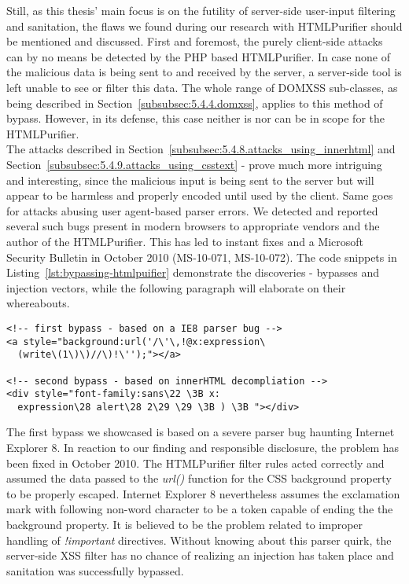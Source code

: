       Still, as this thesis' main focus is on the futility of server-side user-input filtering and sanitation, the flaws we found during our research with HTMLPurifier should be mentioned and discussed. First and foremost, the purely client-side attacks can by no means be detected by the PHP based HTMLPurifier. In case none of the malicious data is being sent to and received by the server, a server-side tool is left unable to see or filter this data. The whole range of DOMXSS sub-classes, as being described in Section~\ref{subsubsec:5.4.4.domxss}, applies to this method of bypass. However, in its defense, this case neither is nor can be in scope for the HTMLPurifier.\\

      The attacks described in Section~\ref{subsubsec:5.4.8.attacks_using_innerhtml} and Section~\ref{subsubsec:5.4.9.attacks_using_csstext} - prove much more intriguing and interesting, since the malicious input is being sent to the server but will appear to be harmless and properly encoded until used by the client. Same goes for attacks abusing user agent-based parser errors. We detected and reported several such bugs present in modern browsers to appropriate vendors and the author of the HTMLPurifier. This has led to instant fixes and a Microsoft Security Bulletin in October 2010 (MS-10-071, MS-10-072). The code snippets in Listing~\ref{lst:bypassing-htmlpuifier} demonstrate the discoveries - bypasses and injection vectors, while the following paragraph will elaborate on their whereabouts. \\

\begin{lstlisting}[label=lst:bypassing-htmlpuifier,caption=Example-bypasses for the HTMLPurifier; note the exclamation mark and the CSS escapes confusing the parser and adding additional obfuscation,captionpos=b]
<!-- first bypass - based on a IE8 parser bug -->
<a style="background:url('/\'\,!@x:expression\
  (write\(1\)\)//\)!\'');"></a>

<!-- second bypass - based on innerHTML decompliation -->
<div style="font-family:sans\22 \3B x:
  expression\28 alert\28 2\29 \29 \3B ) \3B "></div>
\end{lstlisting}
 
      The first bypass we showcased is based on a severe parser bug haunting Internet Explorer 8. In reaction to our finding and responsible disclosure, the problem has been fixed in October 2010. The HTMLPurifier filter rules acted correctly and assumed the data passed to the \textit{url()} function for the CSS background property to be properly escaped. Internet Explorer 8 nevertheless assumes the exclamation mark with following non-word character to be a token capable of ending the the background property. It is believed to be the problem related to improper handling of \textit{!important} directives. Without knowing about this parser quirk, the server-side XSS filter has no chance of realizing an injection has taken place and sanitation was successfully bypassed. \\

